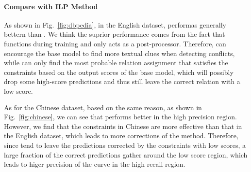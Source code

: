 \paragraph{Compare with ILP Method}
As shown in Fig.~\ref{fig:dbpedia}, in the English dataset, \SL performas generally bettern than \ILP.
We think the suprior performance comes from the fact that \SL functions during training and \ILP only acts as a post-processor.
Therefore, \SL can encourage the base model to find more textual clues when detecting conflicts, while \ILP can only find the most probable relation assignment that satisfies the constraints based on the output scores of the base model, which will possibly drop some high-score predictions and thus still leave the correct relation with a low score.

As for the Chinese dataset, based on the same reason, as shown in Fig.~\ref{fig:chinese}, we can see that \SL performs better in the high precision region.
However, we find that the constraints in Chinese are more effective than that in the English dataset, which leads to more corrections of the \ILP method.
Therefore, since \ILP tend to leave the predictions corrected by the constraints with low scores, a large fraction of the correct predictions gather around the low score region, which leads to higer precision of the \ILP curve in the high recall region.




